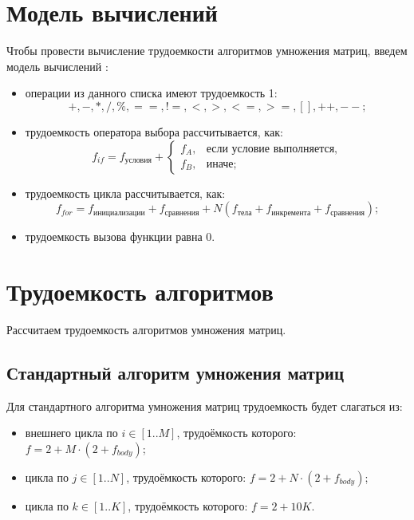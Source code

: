 \clearpage


\section{Модель вычислений}

Чтобы провести вычисление трудоемкости алгоритмов умножения матриц, введем модель вычислений \cite{model}:

\begin{itemize}
	\item операции из данного списка имеют трудоемкость 1:
	\begin{equation}
		\label{for:opers}
		+, -, *, /, \%, ==, !=, <, >, <=, >=, [], ++, {-}-\text{;}
	\end{equation}
	\item трудоемкость оператора выбора  рассчитывается, как:
	\begin{equation}
		\label{for:if}
		f_{if} = f_{\text{условия}} +
		\begin{cases}
			f_A, & \text{если условие выполняется,}\\
			f_B, & \text{иначе;}
		\end{cases}
	\end{equation}
	\item трудоемкость цикла рассчитывается, как:
	\begin{equation}
		\label{for:for}
		f_{for} = f_{\text{инициализации}} + f_{\text{сравнения}} + N(f_{\text{тела}} + f_{\text{инкремента}} + f_{\text{сравнения}})\text{;}
	\end{equation}
	\item трудоемкость вызова функции равна 0.
\end{itemize}


\section{Трудоемкость алгоритмов}

Рассчитаем трудоемкость алгоритмов умножения матриц.

\subsection{Стандартный алгоритм умножения матриц}

Для стандартного алгоритма умножения матриц трудоемкость будет слагаться из:

\begin{itemize}
	\item внешнего цикла по $i \in [1..M]$, трудоёмкость которого: $f = 2 + M \cdot (2 + f_{body})$;
	\item цикла по $j \in [1..N]$, трудоёмкость которого: $f = 2 + N \cdot (2 + f_{body})$;
	\item цикла по $k \in [1..K]$, трудоёмкость которого: $f = 2 + 10K$. \newline
\end{itemize}

